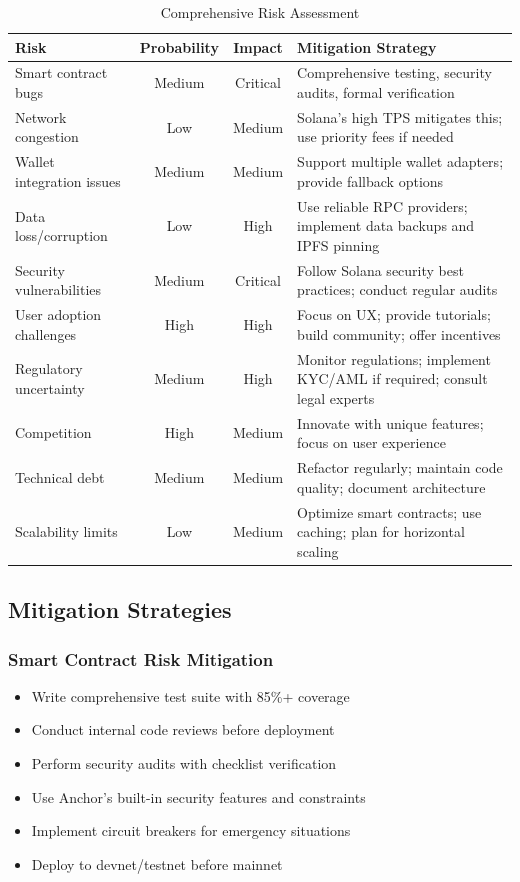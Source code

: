 \documentclass[a4paper,13pt,twoside]{report}
\theoremstyle{definition}
\begin{document}
\begin{table}[h]
\centering
\caption{Comprehensive Risk Assessment}
\small
\begin{tabular}{|p{3.5cm}|c|c|p{4.5cm}|}
\hline
\textbf{Risk} & \textbf{Probability} & \textbf{Impact} & \textbf{Mitigation Strategy} \\
\hline
Smart contract bugs & Medium & Critical & Comprehensive testing, security audits, formal verification \\
\hline
Network congestion & Low & Medium & Solana's high TPS mitigates this; use priority fees if needed \\
\hline
Wallet integration issues & Medium & Medium & Support multiple wallet adapters; provide fallback options \\
\hline
Data loss/corruption & Low & High & Use reliable RPC providers; implement data backups and IPFS pinning \\
\hline
Security vulnerabilities & Medium & Critical & Follow Solana security best practices; conduct regular audits \\
\hline
User adoption challenges & High & High & Focus on UX; provide tutorials; build community; offer incentives \\
\hline
Regulatory uncertainty & Medium & High & Monitor regulations; implement KYC/AML if required; consult legal experts \\
\hline
Competition & High & Medium & Innovate with unique features; focus on user experience \\
\hline
Technical debt & Medium & Medium & Refactor regularly; maintain code quality; document architecture \\
\hline
Scalability limits & Low & Medium & Optimize smart contracts; use caching; plan for horizontal scaling \\
\hline
\end{tabular}
\end{table}

\subsection{Mitigation Strategies}

\subsubsection{Smart Contract Risk Mitigation}

\begin{itemize}
    \item Write comprehensive test suite with 85\%+ coverage
    \item Conduct internal code reviews before deployment
    \item Perform security audits with checklist verification
    \item Use Anchor's built-in security features and constraints
    \item Implement circuit breakers for emergency situations
    \item Deploy to devnet/testnet before mainnet
\end{itemize}
\end{document}
